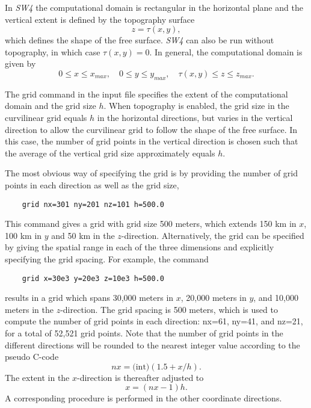 \documentclass[11pt]{report}
\begin{document}
In \emph{SW4} the computational domain is rectangular in the horizontal plane and the vertical extent
is defined by the topography surface
\[
z=\tau(x,y),
\]
which defines the shape of the free surface. \emph{SW4} can also be run without
topography, in which case $\tau(x,y)=0$. In general, the computational domain is given by
\begin{equation}\label{eq:domain}
0\leq x\leq x_{max},\quad 0\leq y\leq y_{max},\quad \tau(x,y) \leq z \leq z_{max}.
\end{equation}

The grid command in the input file specifies the extent of the computational domain and the grid
size $h$. When topography is enabled, the grid size in the curvilinear grid equals $h$ in the
horizontal directions, but varies in the vertical direction to allow the curvilinear grid to follow
the shape of the free surface. In this case, the number of grid points in the vertical direction is
chosen such that the average of the vertical grid size approximately equals $h$.

The most obvious way of specifying the grid is by providing the number of grid points in each
direction as well as the grid size,
%
\begin{verbatim}
	grid nx=301 ny=201 nz=101 h=500.0 
\end{verbatim}
%
This command gives a grid with grid size 500 meters, which extends 150 km in $x$, 100 km in $y$ and
50 km in the $z$-direction. Alternatively, the grid can be specified by giving the spatial range in
each of the three dimensions and explicitly specifying the grid spacing. For example, the command
%
\begin{verbatim}
	grid x=30e3 y=20e3 z=10e3 h=500.0 
\end{verbatim}
%
results in a grid which spans 30,000 meters in $x$, 20,000 meters in $y$, and 10,000
meters in the $z$-direction.  The grid spacing is 500 meters, which is used to compute the
number of grid points in each direction: nx=61, ny=41, and nz=21, for a total of
52,521 grid points. Note that the number of grid points in the different directions will be
rounded to the nearest integer value according to the pseudo C-code
\begin{equation}\label{eq:nx-calculation}
nx = \mbox{(int)} (1.5 + x/h).
\end{equation}
The extent in the $x$-direction is thereafter adjusted to
\begin{equation}\label{eq:x-calculation}
x=(nx-1) h.
\end{equation}
A corresponding procedure is performed in the other coordinate directions.
\end{document}
